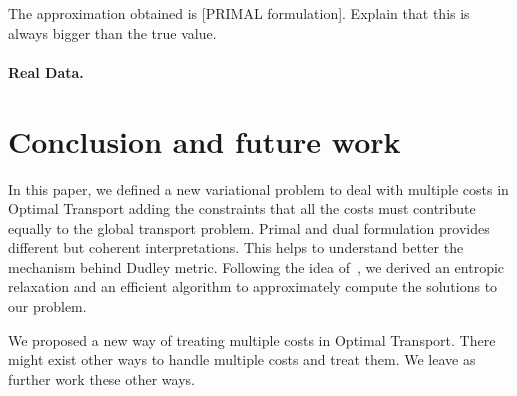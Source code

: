 The approximation obtained is [PRIMAL formulation]. Explain that this is always bigger than the true value. 



\paragraph{Real Data.}


\section{Conclusion and future work}

In this paper, we defined a new variational problem to deal with multiple costs in Optimal Transport adding the constraints that all the costs must contribute equally to the global transport problem. Primal and dual formulation provides different but coherent interpretations. This helps to understand better the mechanism behind Dudley metric. Following the idea of~\cite{cuturi2013sinkhorn}, we derived an entropic relaxation and an efficient algorithm to approximately compute the solutions to our problem.

We proposed a new way of treating multiple costs in Optimal Transport. There might exist other ways to handle multiple costs and treat them. We leave as further work these other ways. 